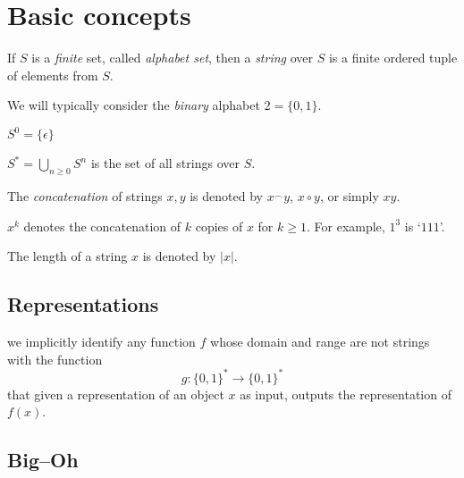 \section{Basic concepts}



If $S$ is a \textit{finite} set, called \textit{alphabet set}, 
then a \textit{string} over $S$ is a finite ordered tuple of elements from $S$. 

We will typically consider the \textit{binary} alphabet $2 = \{0,1\}$.


$S^0 = \{\epsilon\}$

$S^* = \bigcup_{n \geq 0} S^n$ is the set of all strings over $S$.


The \textit{concatenation} of strings $x,y$ is denoted by $x^\frown y$, $x \circ y$, or simply $xy$.


$x^k$ denotes the concatenation of $k$ copies of $x$ for $k \geq 1$. 
% 
For example, 
$1^3$ is `$111$'.

The length of a string $x$ is denoted by $|x|$.


\subsection{Representations}


we implicitly identify any function $f$ whose domain and range are not strings with the function 
\[
    g \colon \{0,1\}^* \to \{0,1\}^*
\]
that given a representation of an object $x$ as input, 
outputs the representation of $f (x)$. 


\subsection{Big--Oh}

